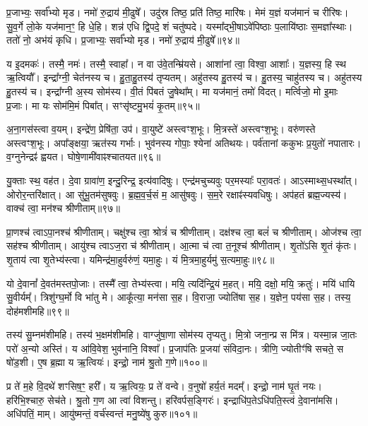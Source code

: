 प्र॒जाभ्यः॒ सर्वा᳚भ्यो मृड।
नमो॑ रु॒द्राय॑ मी॒ढुषे᳚।
उदु॑स्र तिष्ठ॒ प्रति॑ तिष्ठ॒ मारि॑षः।
मेमं य॒ज्ञं यज॑मानं च रीरिषः।
सु॒व॒र्गे लो॒के यज॑मान॒ꣳ॒ हि धे॒हि।
शन्न॑ एधि द्वि॒पदे॒ शं चतु॑ष्पदे।
यस्मा᳚द्भी॒षा\-ऽवे॑पिष्ठाः प॒लायि॑ष्ठाः स॒मज्ञा᳚स्थाः।
ततो॑ नो॒ अभ॑यं कृधि।
प्र॒जाभ्यः॒ सर्वा᳚भ्यो मृड।
नमो॑ रु॒द्राय॑ मी॒ढुषे᳚॥९४॥\ip

य इ॒दमकः॑।
तस्मै॒ नमः॑।
तस्मै॒ स्वाहा᳚।
न वा उ॑वे॒तन्म्रि॑यसे।
आशा॑नां त्वा॒ विश्वा॒ आशाः᳚।
य॒ज्ञस्य॒ हि स्थ ऋ॒त्वियौ᳚।
इन्द्रा᳚ग्नी॒ चेत॑नस्य च।
हु॒ता॒हु॒तस्य॑ तृप्यतम्।
अहु॑तस्य हु॒तस्य॑ च।
हु॒तस्य॒ चाहु॑तस्य च।
अहु॑तस्य हु॒तस्य॑ च।
इन्द्रा᳚ग्नी अ॒स्य सोम॑स्य।
वी॒तं पि॑बतं जु॒षेथा᳚म्।
मा यज॑मानं॒ तमो॑ विदत्।
मर्त्विजो॒ मो इ॒माः प्र॒जाः।
मा यः सोम॑मि॒मं पिबा᳚त्।
सꣳसृ॑ष्टमु॒भयं॑ कृ॒तम्॥९५॥\ip\anuvakamend[कृ॒धि॒ मी॒ढुषे\-ऽहु॑तस्य च स॒प्त च॑]

अ॒ना॒गस॑स्त्वा व॒यम्।
इन्द्रे॑ण॒ प्रेषि॑ता॒ उप॑।
वा॒युष्टे॑ अस्त्वꣳश॒भूः।
मि॒त्रस्ते॑ अस्त्वꣳश॒भूः।
वरु॑णस्ते अस्त्वꣳश॒भूः।
अपा᳚ङ्क्षया॒ ऋत॑स्य गर्भाः।
भुव॑नस्य गोपाः॒ श्येना॑ अतिथयः।
पर्व॑तानां ककुभः प्र॒युतो॑ नपातारः।
व॒ग्नुनेन्द्रꣴ॑ ह्वयत।
घोषे॒णामी॑वाꣴश्चातयत॥९६॥\ip

यु॒क्ताः स्थ॒ वह॑त।
दे॒वा ग्रावा॑ण॒ इन्दु॒रिन्द्र॒ इत्य॑वादिषुः।
एन्द्र॑मचुच्यवुः पर॒मस्याः᳚ परा॒वतः॑।
आऽस्माथ्स॒धस्था᳚त्।
ओरोर॒न्तरि॑क्षात्।
आ सु॑भू॒तम॑सुषवुः।
ब्र॒ह्म॒व॒र्च॒सं म॒ आसु॑षवुः।
स॒म॒रे रक्षाꣴ॑स्यवधिषुः।
अप॑हतं ब्रह्म॒ज्यस्य॑।
वाक्च॑ त्वा॒ मन॑श्च श्रीणीताम्॥९७॥\ip

प्रा॒णश्च॑ त्वा\-ऽपा॒नश्च॑ श्रीणीताम्।
चक्षु॑श्च त्वा॒ श्रोत्रं॑ च श्रीणीताम्।
दक्ष॑श्च त्वा॒ बलं॑ च श्रीणीताम्।
ओज॑श्च त्वा॒ सह॑श्च श्रीणीताम्।
आयु॑श्च त्वा\-ऽज॒रा च॑ श्रीणीताम्।
आ॒त्मा च॑ त्वा त॒नूश्च॑ श्रीणीताम्।
शृ॒तो॑ऽसि शृ॒तं कृ॑तः।
शृ॒ताय॑ त्वा शृ॒तेभ्य॑स्त्वा।
यमिन्द्र॑मा॒हुर्वरु॑णं॒ यमा॒हुः।
यं मि॒त्रमा॒हुर्यमु॑ स॒त्यमा॒हुः॥९८॥\ip

यो दे॒वानां᳚ दे॒वत॑मस्तपो॒जाः।
तस्मै᳚ त्वा॒ तेभ्य॑स्त्वा।
मयि॒ त्यदि॑न्द्रि॒यं म॒हत्।
मयि॒ दक्षो॒ मयि॒ क्रतुः॑।
मयि॑ धायि सु॒वीर्यम्᳚।
त्रिशु॑ग्घ॒र्मो वि भा॑तु मे।
आकू᳚त्या॒ मन॑सा स॒ह।
वि॒राजा॒ ज्योति॑षा स॒ह।
य॒ज्ञेन॒ पय॑सा स॒ह।
तस्य॒ दोह॑मशीमहि॥९९॥\ip

तस्य॑ सु॒म्नम॑शीमहि।
तस्य॑ भ॒क्षम॑शीमहि।
वाग्जु॑षा॒णा सोम॑स्य तृप्यतु।
मि॒त्रो जना॒न्प्र स मि॑त्र।
यस्मा॒न्न जा॒तः परो॑ अ॒न्यो अस्ति॑।
य आ॑वि॒वेश॒ भुव॑नानि॒ विश्वा᳚।
प्र॒जा\-प॑तिः प्र॒जया॑ संविदा॒नः।
त्रीणि॒ ज्योतीꣳ॑षि सचते॒ स षो॑ड॒शी।
ए॒ष ब्र॒ह्मा य ऋ॒त्वियः॑।
इन्द्रो॒ नाम॑ श्रु॒तो ग॒णे॥१००॥\ip

प्र ते॑ म॒हे वि॒दथे॑ शꣳसिष॒ꣳ॒ हरी᳚।
य ऋ॒त्वियः॒ प्र ते॑ वन्वे।
व॒नुषो॑ हर्य॒तं मदम्᳚।
इन्द्रो॒ नाम॑ घृ॒तं नयः।
हरि॑भि॒श्चारु॒ सेच॑ते।
श्रु॒तो ग॒ण आ त्वा॑ विशन्तु।
हरि॑वर्पस॒ङ्गिरः॑।
इन्द्राधि॑प॒ते\-ऽधि॑पति॒स्त्वं दे॒वाना॑मसि।
अधि॑पतिं॒ माम्।
आयु॑ष्मन्तं॒ वर्च॑स्वन्तं मनु॒ष्ये॑षु कुरु॥१०१॥\ip

